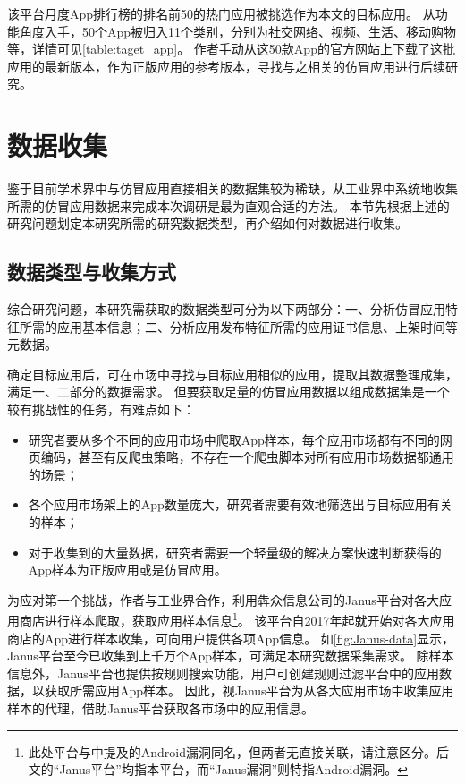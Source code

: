该平台月度App排行榜的排名前50的热门应用被挑选作为本文的目标应用。
从功能角度入手，50个App被归入11个类别，分别为社交网络、视频、生活、移动购物等，详情可见\autoref{table:taget_app}。
作者手动从这50款App的官方网站上下载了这批应用的最新版本，作为正版应用的参考版本，寻找与之相关的仿冒应用进行后续研究。


\section{数据收集}
鉴于目前学术界中与仿冒应用直接相关的数据集较为稀缺，从工业界中系统地收集所需的仿冒应用数据来完成本次调研是最为直观合适的方法。
本节先根据上述的研究问题划定本研究所需的研究数据类型，再介绍如何对数据进行收集。

\subsection{数据类型与收集方式}

综合研究问题，本研究需获取的数据类型可分为以下两部分：一、分析仿冒应用特征所需的应用基本信息；二、分析应用发布特征所需的应用证书信息、上架时间等元数据。

确定目标应用后，可在市场中寻找与目标应用相似的应用，提取其数据整理成集，满足一、二部分的数据需求。
但要获取足量的仿冒应用数据以组成数据集是一个较有挑战性的任务，有难点如下：
\begin{itemize}
	\item 研究者要从多个不同的应用市场中爬取App样本，每个应用市场都有不同的网页编码，甚至有反爬虫策略，不存在一个爬虫脚本对所有应用市场数据都通用的场景；
	\item 各个应用市场架上的App数量庞大，研究者需要有效地筛选出与目标应用有关的样本；
	\item 对于收集到的大量数据，研究者需要一个轻量级的解决方案快速判断获得的App样本为正版应用或是仿冒应用。
\end{itemize}

为应对第一个挑战，作者与工业界合作，利用犇众信息公司的Janus平台对各大应用商店进行样本爬取，获取应用样本信息\footnote{此处平台与中提及的Android漏洞同名，但两者无直接关联，请注意区分。后文的``Janus平台''均指本平台，而``Janus漏洞''则特指Android漏洞。}。
该平台自2017年起就开始对各大应用商店的App进行样本收集，可向用户提供各项App信息。
如\autoref{fig:Janus-data}显示，Janus平台至今已收集到上千万个App样本，可满足本研究数据采集需求。
除样本信息外，Janus平台也提供按规则搜索功能，用户可创建规则过滤平台中的应用数据，以获取所需应用App样本。
因此，视Janus平台为从各大应用市场中收集应用样本的代理，借助Janus平台获取各市场中的应用信息。

